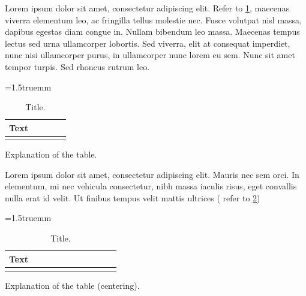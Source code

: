 \documentclass[english,fleqn]{ieej-tec2}%
\begin{document}
Lorem ipsum dolor sit amet, consectetur adipiscing elit. Refer to \tablename\ref{tab:example}, maecenas viverra elementum leo, ac fringilla tellus molestie nec. Fusce volutpat nisl massa, dapibus egestas diam congue in. Nullam bibendum leo massa. Maecenas tempus lectus sed urna ullamcorper lobortis. Sed viverra, elit at consequat imperdiet, nunc nisi ullamcorper purus, in ullamcorper nunc lorem eu sem. Nunc sit amet tempor turpis. Sed rhoncus rutrum leo.

\begin{table}[b]
\centering
\caption{Title.}
\label{tab:example}
\tabcolsep=1.5truemm
\begin{tabular}{|c|c|c|c|c|}\hline
Text & \hspace{4zw} &  \hspace{4zw} &  \hspace{4zw} &  \hspace{4zw} \\\hline
& & & & \\\hline
\end{tabular}
\par
\begin{minipage}{68truemm}
\scriptsize%
Explanation of the table.
\end{minipage}
\end{table}

Lorem ipsum dolor sit amet, consectetur adipiscing elit. Mauris nec sem orci. In elementum, mi nec vehicula consectetur, nibh massa iaculis risus, eget convallis nulla erat id velit. Ut finibus tempus velit mattis ultrices ( refer to \tablename\ref{tab:nidanfloat:example})

\begin{table}[t]
\centering
\caption{Title.}
\label{tab:nidanfloat:example}
\tabcolsep=1.5truemm
\begin{tabular}{|c|c|c|c|c|c|c|c|c|c|c|}\hline
Text & \hspace{4zw} &  \hspace{4zw} &  \hspace{4zw} &  \hspace{4zw} &  \hspace{4zw} &  \hspace{4zw} &  \hspace{4zw} &  \hspace{4zw} &  \hspace{4zw} &  \hspace{4zw} \\\hline
& & & & & & & & & & \\\hline
\end{tabular}
\par
\begin{minipage}{\hsize}
\scriptsize\centering%
Explanation of the table (centering).
\end{minipage}
\end{table}
\end{document}
